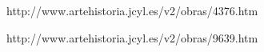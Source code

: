 \begin{description}
\item[] http://www.artehistoria.jcyl.es/v2/obras/4376.htm



\item[] http://www.artehistoria.jcyl.es/v2/obras/9639.htm





\end{description}